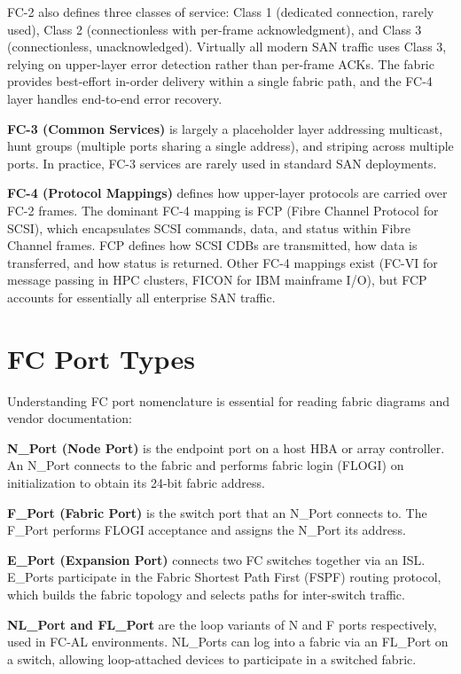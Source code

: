 FC-2 also defines three classes of service: Class 1 (dedicated connection, rarely used), Class 2 (connectionless with per-frame acknowledgment), and Class 3 (connectionless, unacknowledged). Virtually all modern SAN traffic uses Class 3, relying on upper-layer error detection rather than per-frame ACKs. The fabric provides best-effort in-order delivery within a single fabric path, and the FC-4 layer handles end-to-end error recovery.

\textbf{FC-3 (Common Services)} is largely a placeholder layer addressing multicast, hunt groups (multiple ports sharing a single address), and striping across multiple ports. In practice, FC-3 services are rarely used in standard SAN deployments.

\textbf{FC-4 (Protocol Mappings)} defines how upper-layer protocols are carried over FC-2 frames. The dominant FC-4 mapping is FCP (Fibre Channel Protocol for SCSI), which encapsulates SCSI commands, data, and status within Fibre Channel frames. FCP defines how SCSI CDBs are transmitted, how data is transferred, and how status is returned. Other FC-4 mappings exist (FC-VI for message passing in HPC clusters, FICON for IBM mainframe I/O), but FCP accounts for essentially all enterprise SAN traffic.

\section{FC Port Types}
Understanding FC port nomenclature is essential for reading fabric diagrams and vendor documentation:

\textbf{N\_Port (Node Port)} is the endpoint port on a host HBA or array controller. An N\_Port connects to the fabric and performs fabric login (FLOGI) on initialization to obtain its 24-bit fabric address.

\textbf{F\_Port (Fabric Port)} is the switch port that an N\_Port connects to. The F\_Port performs FLOGI acceptance and assigns the N\_Port its address.

\textbf{E\_Port (Expansion Port)} connects two FC switches together via an ISL. E\_Ports participate in the Fabric Shortest Path First (FSPF) routing protocol, which builds the fabric topology and selects paths for inter-switch traffic.

\textbf{NL\_Port and FL\_Port} are the loop variants of N and F ports respectively, used in FC-AL environments. NL\_Ports can log into a fabric via an FL\_Port on a switch, allowing loop-attached devices to participate in a switched fabric.

